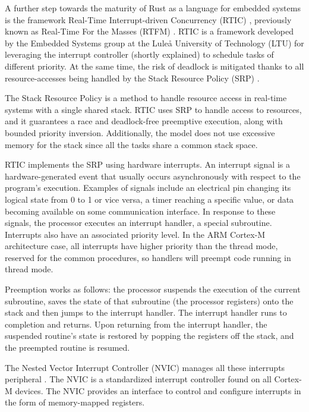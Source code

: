 A further step towards the maturity of Rust as a language for embedded systems is the framework Real-Time Interrupt-driven Concurrency (RTIC) \cite{rtic}, previously known as Real-Time For the Masses (RTFM) \cite{rtfm}. RTIC is a framework developed by the Embedded Systems group at the Luleå University of Technology (LTU) for leveraging the interrupt controller (shortly explained) to schedule tasks of different priority. At the same time, the risk of deadlock is mitigated thanks to all resource-accesses being handled by the Stack Resource Policy (SRP) \cite{stack-resource-policy}.

The Stack Resource Policy is a method to handle resource access in real-time systems with a single shared stack. RTIC uses SRP to handle access to resources, and it guarantees a race and deadlock-free preemptive execution, along with bounded priority inversion. Additionally, the model does not use excessive memory for the stack since all the tasks share a common stack space.

RTIC implements the SRP using hardware interrupts. An interrupt signal is a hardware-generated event that usually occurs asynchronously with respect to the program's execution. Examples of signals include an electrical pin changing its logical state from 0 to 1 or vice versa, a timer reaching a specific value, or data becoming available on some communication interface. In response to these signals, the processor executes an interrupt handler, a special subroutine. Interrupts also have an associated priority level. In the ARM Cortex-M architecture case, all interrupts have higher priority than the thread mode, reserved for the common procedures, so handlers will preempt code running in thread mode.

Preemption works as follows: the processor suspends the execution of the current subroutine, saves the state of that subroutine (the processor registers) onto the stack and then jumps to the interrupt handler. The interrupt handler runs to completion and returns. Upon returning from the interrupt handler, the suspended routine's state is restored by popping the registers off the stack, and the preempted routine is resumed.

The Nested Vector Interrupt Controller (NVIC) manages all these interrupts peripheral \cite{definitive-guide-cortex}. The NVIC is a standardized interrupt controller found on all Cortex-M devices. The NVIC provides an interface to control and configure interrupts in the form of memory-mapped registers.

